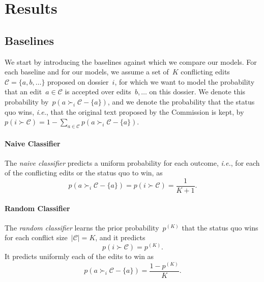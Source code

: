 \section{Results}
\label{lmp:sec:results}

\subsection{Baselines}

We start by introducing the baselines against which we compare our models.
For each baseline and for our models, we assume a set of~$K$ conflicting edits \mbox{$\mathcal{C} = \{ a, b, \ldots \}$} proposed on dossier~$i$, for which we want to model the probability that an edit~$a \in \mathcal{C}$ is accepted over edits~$b, \ldots$ on this dossier.
We denote this probability by~$p\left( a \succ_i \mathcal{C} - \{ a\} \right)$, and we denote the probability that the status quo wins, \textit{i.e.}, that the original text proposed by the Commission is kept, by~$p\left( i \succ \mathcal{C} \right) = 1 - \sum_{a\in \mathcal{C}} p\left( a \succ_i \mathcal{C} - \{a\} \right)$.

\paragraph{Naive Classifier}

The \textit{naive classifier} predicts a uniform probability for each outcome, \textit{i.e.}, for each of the conflicting edits or the status quo to win, as
\begin{equation*}
	p\left( a \succ_i \mathcal{C} - \{ a\} \right) = p\left( i \succ \mathcal{C} \right) = \frac{1}{K + 1}.
\end{equation*}

\paragraph{Random Classifier}

The \textit{random classifier} learns the prior probability~$p^{(K)}$ that the status quo wins for each conflict size~$\vert \mathcal{C} \vert = K$, and it predicts
\begin{equation*}
	p\left( i \succ \mathcal{C} \right) = p^{(K)}.
\end{equation*}
It predicts uniformly each of the edits to win as
\begin{equation*}
	p\left( a \succ_i \mathcal{C} - \{ a\} \right) = \frac{1-p^{(K)}}{K}.
\end{equation*}


